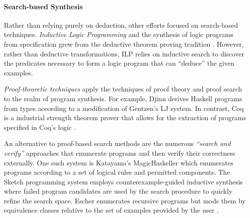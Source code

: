 \paragraph{Search-based Synthesis}

Rather than relying purely on deduction, other efforts focused on search-based
techniques.  \emph{Inductive Logic Programming} and the synthesis of logic
programs from specification grew from the deductive theorem proving tradition
\cite{muggleton-jlp-1994}.  However, rather than deductive transformations, ILP
relies on inductive search to discover the predicates necessary to form a logic
program that can ``deduce'' the given examples.

\emph{Proof-theoretic techniques} apply the techniques of proof theory and proof
search to the realm of program synthesis.  For example, Djinn derives Haskell
programs from types \cite{augustsson-2004} according to a modification of
Gentzen's LJ system.  In contrast, Coq is a industrial strength theorem prover
that allows for the extraction of programs specified in Coq's logic
\cite{coq-2012}.

An alternative to proof-based search methods are the numerous \emph{``search and
verify''} approaches that enumerate programs and then verify their correctness
externally.  One such system is Katayama's MagicHaskeller
\cite{katayama-pepm-2012} which enumerates programs according to a set of
logical rules and permitted components.  The Sketch programming system
\cite{solar-lezama-thesis-2008} employs counterexample-guided inductive
synthesis where failed program candidates are used by the search procedure to
quickly refine the search space.  Escher enumerates recursive programs but mods
them by equivalence classes relative to the set of examples provided by the user
\cite{albarghouthi-cav-2013}.
